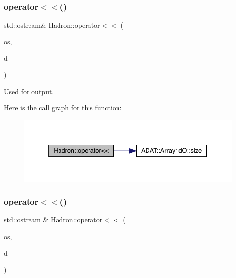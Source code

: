 \subsubsection{\texorpdfstring{operator$<$$<$()}{operator<<()}\hspace{0.1cm}{\footnotesize\ttfamily [27/48]}}
{\footnotesize\ttfamily std\+::ostream\& Hadron\+::operator$<$$<$ (\begin{DoxyParamCaption}\item[{std\+::ostream \&}]{os,  }\item[{const \mbox{\hyperlink{classADAT_1_1Array1dO}{Array1dO}}$<$ \mbox{\hyperlink{structHadron_1_1KeyHadronNPartIrrepOp__t_1_1CGPair__t}{Key\+Hadron\+N\+Part\+Irrep\+Op\+\_\+t\+::\+C\+G\+Pair\+\_\+t}} $>$ \&}]{d }\end{DoxyParamCaption})}



Used for output. 

Here is the call graph for this function\+:
\nopagebreak
\begin{figure}[H]
\begin{center}
\leavevmode
\includegraphics[width=332pt]{d1/daf/namespaceHadron_a3dd51258353773598e3f2a8a3252816f_cgraph}
\end{center}
\end{figure}
\mbox{\label{namespaceHadron_a24d0db7f972f8d517641ad9235bfa33c}} 
\subsubsection{\texorpdfstring{operator$<$$<$()}{operator<<()}\hspace{0.1cm}{\footnotesize\ttfamily [28/48]}}
{\footnotesize\ttfamily std\+::ostream \& Hadron\+::operator$<$$<$ (\begin{DoxyParamCaption}\item[{std\+::ostream \&}]{os,  }\item[{const \mbox{\hyperlink{structHadron_1_1KeyMesonElementalOperator__t}{Key\+Meson\+Elemental\+Operator\+\_\+t}} \&}]{d }\end{DoxyParamCaption})}



